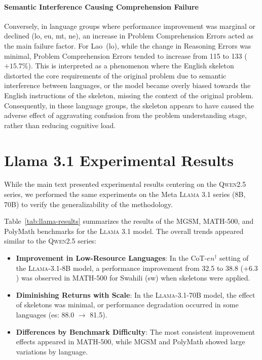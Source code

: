 \paragraph{Semantic Interference Causing Comprehension Failure}
Conversely, in language groups where performance improvement was marginal or declined (lo, eu, mt, ne), an increase in Problem Comprehension Errors acted as the main failure factor.
For Lao~(lo), while the change in Reasoning Errors was minimal, Problem Comprehension Errors tended to increase from 115 to 133 ($+15.7\%$). This is interpreted as a phenomenon where the English skeleton distorted the core requirements of the original problem due to semantic interference between languages, or the model became overly biased towards the English instructions of the skeleton, missing the context of the original problem. Consequently, in these language groups, the skeleton appears to have caused the adverse effect of aggravating confusion from the problem understanding stage, rather than reducing cognitive load.

\section{Llama 3.1 Experimental Results}\label{Appendix:Llama-results}


While the main text presented experimental results centering on the \textsc{Qwen2.5} series, we performed the same experiments on the Meta \textsc{Llama 3.1} series (8B, 70B) to verify the generalizability of the methodology.

Table~\ref{tab:llama-results} summarizes the results of the MGSM, MATH-500, and PolyMath benchmarks for the \textsc{Llama 3.1} model. The overall trends appeared similar to the \textsc{Qwen2.5} series:

\begin{itemize}
    \item \textbf{Improvement in Low-Resource Languages}: In the CoT-$en^{\dagger}$ setting of the \textsc{Llama-3.1-8B} model, a performance improvement from 32.5 to 38.8 ($+6.3$) was observed in MATH-500 for Swahili (sw) when skeletons were applied.
    \item \textbf{Diminishing Returns with Scale}: In the \textsc{Llama-3.1-70B} model, the effect of skeletons was minimal, or performance degradation occurred in some languages (es: 88.0 $\rightarrow$ 81.5).
    \item \textbf{Differences by Benchmark Difficulty}: The most consistent improvement effects appeared in MATH-500, while MGSM and PolyMath showed large variations by language.
\end{itemize}

